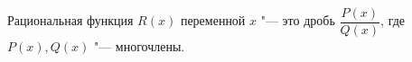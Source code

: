 
	Рациональная функция $R(x)$ переменной $x$ "--- это дробь $\dfrac{P(x)}{Q(x)}$, где $P(x),Q(x)$ "--- многочлены.
